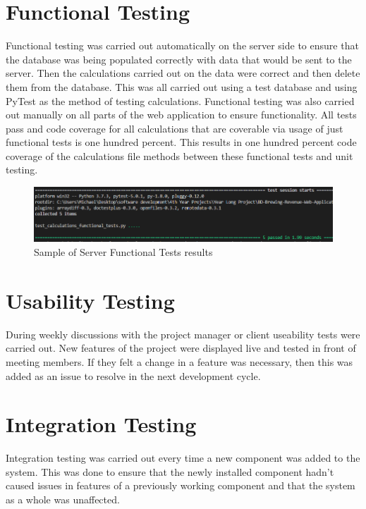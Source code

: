 \section{Functional Testing}
Functional testing was carried out automatically on the server side to ensure that the database was being populated correctly with data that would be sent to the server. Then the calculations carried out on the data were correct and then delete them from the database. This was all carried out using a test database and using PyTest as the method of testing calculations. Functional testing was also carried out manually on all parts of the web application to ensure functionality.  All tests pass and code coverage for all calculations that are coverable via usage of just functional tests is one hundred percent. This results in one hundred percent code coverage of the calculations file methods between these functional tests and unit testing.
\begin{figure}[h!]
 	\caption{Sample of Server Functional Tests results}
	\label{image:unittests}
 	\centering
 	\includegraphics[width=1\textwidth]{Images/pytest results.PNG}
\end{figure}

\section{Usability Testing}
During weekly discussions with the project manager or client useability tests were carried out. New features of the project were displayed live and tested in front of meeting members. If they felt a change in a feature was necessary, then this was added as an issue to resolve in the next development cycle. 

\section{Integration Testing}
Integration testing was carried out every time a new component was added to the system. This was done to ensure that the newly installed component hadn’t caused issues in features of a previously working component and that the system as a whole was unaffected.

